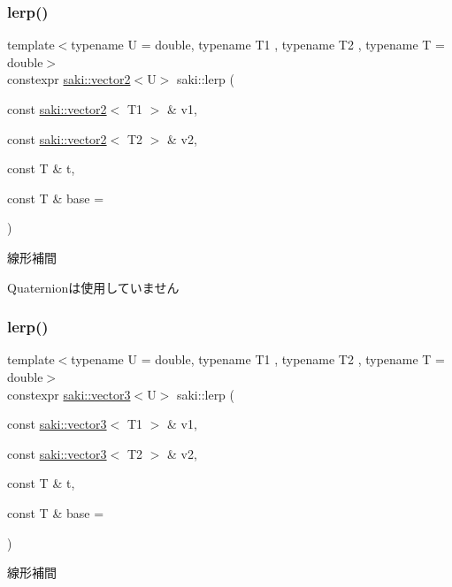 \subsubsection{\texorpdfstring{lerp()}{lerp()}\hspace{0.1cm}{\footnotesize\ttfamily [1/3]}}
{\footnotesize\ttfamily template$<$typename U  = double, typename T1 , typename T2 , typename T  = double$>$ \\
constexpr \mbox{\hyperlink{classsaki_1_1vector2}{saki\+::vector2}}$<$U$>$ saki\+::lerp (\begin{DoxyParamCaption}\item[{const \mbox{\hyperlink{classsaki_1_1vector2}{saki\+::vector2}}$<$ T1 $>$ \&}]{v1,  }\item[{const \mbox{\hyperlink{classsaki_1_1vector2}{saki\+::vector2}}$<$ T2 $>$ \&}]{v2,  }\item[{const T \&}]{t,  }\item[{const T \&}]{base = {} }\end{DoxyParamCaption})}



線形補間 

Quaternionは使用していません \mbox{\label{namespacesaki_a1dc5233651ca71b38ed5a53ef304e480}} 
\subsubsection{\texorpdfstring{lerp()}{lerp()}\hspace{0.1cm}{\footnotesize\ttfamily [2/3]}}
{\footnotesize\ttfamily template$<$typename U  = double, typename T1 , typename T2 , typename T  = double$>$ \\
constexpr \mbox{\hyperlink{classsaki_1_1vector3}{saki\+::vector3}}$<$U$>$ saki\+::lerp (\begin{DoxyParamCaption}\item[{const \mbox{\hyperlink{classsaki_1_1vector3}{saki\+::vector3}}$<$ T1 $>$ \&}]{v1,  }\item[{const \mbox{\hyperlink{classsaki_1_1vector3}{saki\+::vector3}}$<$ T2 $>$ \&}]{v2,  }\item[{const T \&}]{t,  }\item[{const T \&}]{base = {} }\end{DoxyParamCaption})}



線形補間 

